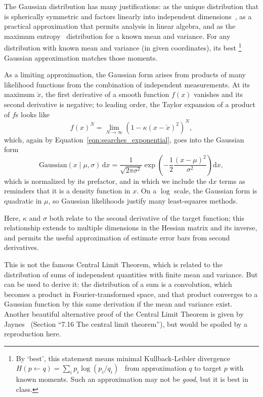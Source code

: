 The Gaussian distribution has many justifications:
as the unique distribution that is spherically symmetric and factors linearly
into independent dimensions~\cite{
jaynes2003probability,
herschel1850normal,
maxwell1860normal,
muller1959note,
marsaglia1972normal
},
as a practical approximation that permits analysis in linear algebra,
and as the maximum entropy~\cite{PhysRev.106.620} distribution for a
known mean and variance.
For any distribution with known mean and variance (in given coordinates),
its best%
\footnote{%
By `best', this statement means minimal Kullback-Leibler divergence
\(
H(p\leftarrow q) = \sum_i p_i \log(p_i/q_i)
\)~\cite{
skilling2010foundations
}
from approximation $q$ to target $p$ with known moments.
Such an approximation may not be \emph{good}, but it is best in class.%
}
Gaussian approximation matches those moments.

As a limiting approximation, the Gaussian form arises from products of many
likelihood functions from the combination of independent measurements.
At its maximum $\check{x}$, the first derivative of a smooth function $f(x)$
vanishes and its second derivative is negative;
to leading order, the Taylor expansion of a product of $f$s looks like
\begin{equation}
f(x)^N =
\lim_{N \to \infty}\!
\left(
1 - \kappa (x - \check{x})^2
\right)^N,
\end{equation}
which, again by Equation~\ref{eqn:searches_exponential}, goes into the Gaussian
form
\begin{equation}
\label{eqn:searches_gaussian}
\mathrm{Gaussian}(x\mid \mu, \sigma)
\,\mathrm{d}x =
\frac{1}{\sqrt{2\pi \sigma^2}}
\exp\!\left(-\frac{1}{2}\frac{(x - \mu)^2}{\sigma^2}\right)
\mathrm{d}x
,
\end{equation}
which is normalized by its prefactor, and in which we include the
$\mathrm{d}x$ terms as reminders that it is a density function in $x$.
On a $\log$ scale, the Gaussian form is quadratic in $\mu$, so
Gaussian likelihoods justify many least-squares methods.

Here, $\kappa$ and $\sigma$ both relate to the second derivative of the target
function; this relationship extends to multiple dimensions in the Hessian
matrix and its inverse, and permits the useful approximation of estimate error
bars from second derivatives.

This is not the famous Central Limit Theorem, which is related to the
distribution of sums of independent quantities with finite mean and variance.
But can be used to derive it: the distribution of a sum is a convolution, which
becomes a product in Fourier-transformed space, and that product converges
to a Gaussian function by this same derivation if the mean and variance exist.
Another beautiful alternative proof of the Central Limit Theorem is given by
Jaynes~\cite{jaynes2003probability}
(Section ``7.16 The central limit theorem''), but would be spoiled by a
reproduction here.

